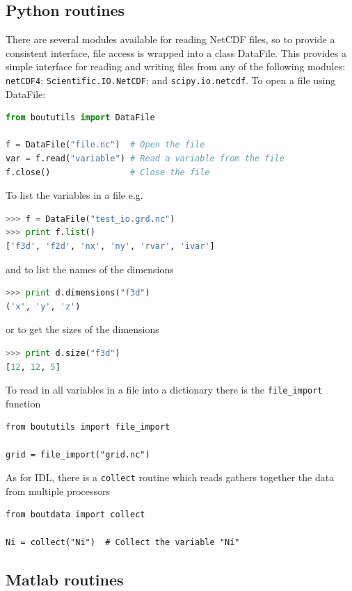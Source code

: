 \documentclass[12pt]{article}
\begin{document}
\subsection{Python routines}
\label{sec:pythonroutines}
There are several modules available for reading
NetCDF files, so to provide a consistent interface, file access is wrapped into a class DataFile. This
provides a simple interface for reading and writing files from any of the following modules:
\texttt{netCDF4}; \texttt{Scientific.IO.NetCDF}; and \texttt{scipy.io.netcdf}. 
To open a file using DataFile:
\begin{lstlisting}[language=python,numbers=none]
from boututils import DataFile

f = DataFile("file.nc")  # Open the file
var = f.read("variable") # Read a variable from the file
f.close()                # Close the file
\end{lstlisting}

To list the variables in a file e.g.
\begin{lstlisting}[language=python,numbers=none]
>>> f = DataFile("test_io.grd.nc")
>>> print f.list()
['f3d', 'f2d', 'nx', 'ny', 'rvar', 'ivar']
\end{lstlisting}
and to list the names of the dimensions
\begin{lstlisting}[language=python,numbers=none]
>>> print d.dimensions("f3d")
('x', 'y', 'z')
\end{lstlisting}
or to get the sizes of the dimensions
\begin{lstlisting}[language=python,numbers=none]
>>> print d.size("f3d")
[12, 12, 5]
\end{lstlisting}

To read in all variables in a file into a dictionary there is
the \texttt{file\_import} function
\begin{lstlisting}
from boututils import file_import

grid = file_import("grid.nc")
\end{lstlisting}

As for IDL, there is a \texttt{collect} routine which reads gathers together the data from multiple processors
\begin{lstlisting}
from boutdata import collect

Ni = collect("Ni")  # Collect the variable "Ni"
\end{lstlisting}

\subsection{Matlab routines}
\end{document}
